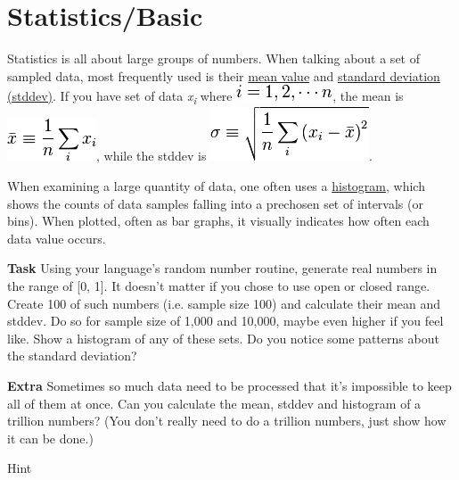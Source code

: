 \pagebreak{}
\section*{Statistics/Basic}

Statistics is all about large groups of numbers. When talking about a
set of sampled data, most frequently used is their
\href{http://en.wikipedia.org/wiki/Mean}{mean value} and
\href{http://en.wikipedia.org/wiki/3333Standard\_deviation}{standard
deviation (stddev)}. If you have set of data
\emph{x}\textsubscript{\emph{i}} where
\includegraphics[scale=.6]{graphics/4a4a450cda66c931dce2ee4b3b3af329.png},
the mean is
\includegraphics[scale=.6]{graphics/520b3480cda5c9ab4ab7691ae9cdd696.png},
while the stddev is
\includegraphics[scale=.6]{graphics/d678d4d0af6d46165b3712e36b9718d9.png}.

When examining a large quantity of data, one often uses a
\href{http://en.wikipedia.org/wiki/Histogram}{histogram}, which shows
the counts of data samples falling into a prechosen set of intervals (or
bins). When plotted, often as bar graphs, it visually indicates how
often each data value occurs.

\textbf{Task} Using your language's random number routine, generate real
numbers in the range of {[}0, 1{]}. It doesn't matter if you chose to
use open or closed range. Create 100 of such numbers (i.e. sample size
100) and calculate their mean and stddev. Do so for sample size of 1,000
and 10,000, maybe even higher if you feel like. Show a histogram of any
of these sets. Do you notice some patterns about the standard deviation?

\textbf{Extra} Sometimes so much data need to be processed that it's
impossible to keep all of them at once. Can you calculate the mean,
stddev and histogram of a trillion numbers? (You don't really need to do
a trillion numbers, just show how it can be done.)

\begin{description}
\item[Hint]
\end{description}

